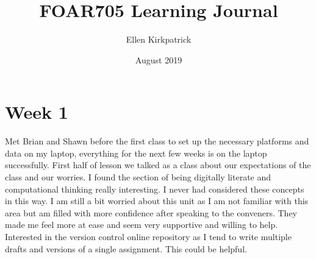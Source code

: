 \documentclass{article}
\title{FOAR705 Learning Journal}
\author{Ellen Kirkpatrick }
\date{August 2019}
\begin{document}
\maketitle

\section{Week 1}
Met Brian and Shawn before the first class to set up the necessary platforms and data on my laptop, everything for the next few weeks is on the laptop successfully.
First half of lesson we talked as a class about our expectations of the class and our worries. I found the section of being digitally literate and computational thinking really interesting. I never had considered these concepts in this way. 
I am still a bit worried about this unit as I am not familiar with this area but am filled with more confidence after speaking to the conveners. They made me feel more at ease and seem very supportive and willing to help. 
Interested in the version control online repository as I tend to write multiple drafts and versions of a single assignment. This could be helpful. 
\end{document}
